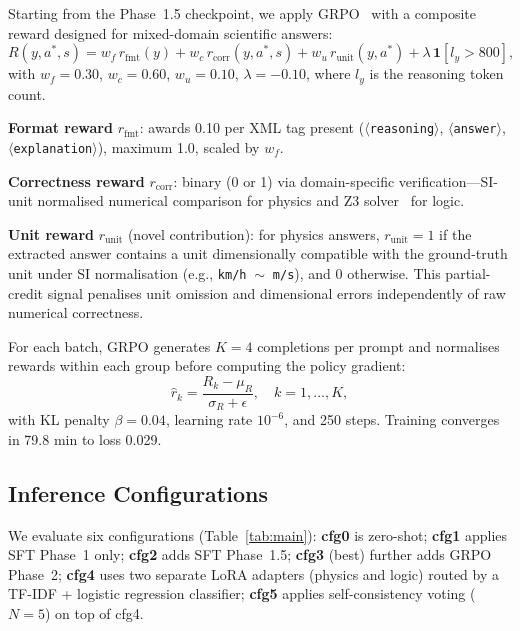 \documentclass{ieeeaccess}
\begin{document}
Starting from the Phase~1.5 checkpoint, we apply GRPO~\cite{Shao2024}
with a composite reward designed for mixed-domain scientific answers:
\begin{equation}
  R(y,a^*,s) =
    w_f\,r_\text{fmt}(y)
  + w_c\,r_\text{corr}(y,a^*,s)
  + w_u\,r_\text{unit}(y,a^*)
  + \lambda\,\mathbf{1}\!\left[l_y > 800\right],
  \label{eq:reward}
\end{equation}
with $w_f{=}0.30$, $w_c{=}0.60$, $w_u{=}0.10$, $\lambda{=}{-}0.10$,
where $l_y$ is the reasoning token count.

\textbf{Format reward} $r_\text{fmt}$: awards 0.10 per XML tag present
($\langle$\texttt{reasoning}$\rangle$, $\langle$\texttt{answer}$\rangle$,
$\langle$\texttt{explanation}$\rangle$), maximum 1.0, scaled by $w_f$.

\textbf{Correctness reward} $r_\text{corr}$: binary (0 or 1) via
domain-specific verification---SI-unit normalised numerical comparison for
physics and Z3 solver~\cite{Pan2023} for logic.

\textbf{Unit reward} $r_\text{unit}$ (novel contribution):
for physics answers, $r_\text{unit}{=}1$ if the extracted answer contains
a unit dimensionally compatible with the ground-truth unit under SI
normalisation (e.g., \texttt{km/h}$\;\sim\;$\texttt{m/s}), and 0 otherwise.
This partial-credit signal penalises unit omission and dimensional errors
independently of raw numerical correctness.

For each batch, GRPO generates $K{=}4$ completions per prompt and
normalises rewards within each group before computing the policy gradient:
\begin{equation}
  \hat{r}_k = \frac{R_k - \mu_R}{\sigma_R + \epsilon},
  \quad k = 1,\ldots,K,
  \label{eq:grpo}
\end{equation}
with KL penalty $\beta{=}0.04$, learning rate $10^{-6}$, and 250 steps.
Training converges in 79.8 min to loss 0.029.

\subsection{Inference Configurations}

We evaluate six configurations (Table~\ref{tab:main}):
\textbf{cfg0} is zero-shot;
\textbf{cfg1} applies SFT Phase~1 only;
\textbf{cfg2} adds SFT Phase~1.5;
\textbf{cfg3} (best) further adds GRPO Phase~2;
\textbf{cfg4} uses two separate LoRA adapters (physics and logic) routed
by a TF-IDF + logistic regression classifier;
\textbf{cfg5} applies self-consistency voting ($N{=}5$) on top of cfg4.
\end{document}
